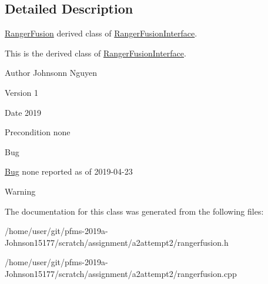 \subsection{Detailed Description}
\hyperlink{classRangerFusion}{Ranger\+Fusion} derived class of \hyperlink{classRangerFusionInterface}{Ranger\+Fusion\+Interface}. 

This is the derived class of \hyperlink{classRangerFusionInterface}{Ranger\+Fusion\+Interface}.~\newline
\begin{DoxyAuthor}{Author}
Johnsonn Nguyen 
\end{DoxyAuthor}
\begin{DoxyVersion}{Version}
1 
\end{DoxyVersion}
\begin{DoxyDate}{Date}
2019 
\end{DoxyDate}
\begin{DoxyPrecond}{Precondition}
none 
\end{DoxyPrecond}
\begin{DoxyRefDesc}{Bug}
\item[\hyperlink{bug__bug000005}{Bug}]none reported as of 2019-\/04-\/23 \end{DoxyRefDesc}
\begin{DoxyWarning}{Warning}

\end{DoxyWarning}


The documentation for this class was generated from the following files\+:\begin{DoxyCompactItemize}
\item 
/home/user/git/pfms-\/2019a-\/\+Johnson15177/scratch/assignment/a2attempt2/rangerfusion.\+h\item 
/home/user/git/pfms-\/2019a-\/\+Johnson15177/scratch/assignment/a2attempt2/rangerfusion.\+cpp\end{DoxyCompactItemize}
